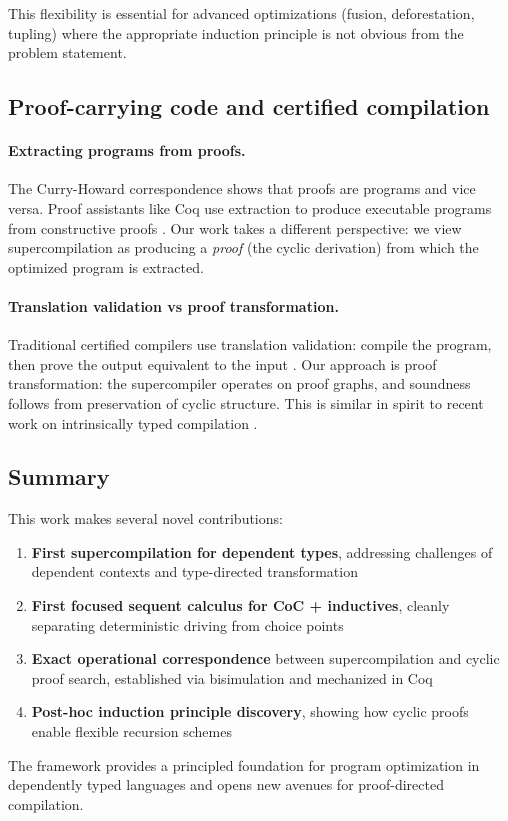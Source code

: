 This flexibility is essential for advanced optimizations (fusion, deforestation, tupling) where the appropriate induction principle is not obvious from the problem statement.

\subsection{Proof-carrying code and certified compilation}

\paragraph{Extracting programs from proofs.}
The Curry-Howard correspondence shows that proofs are programs and vice versa.
Proof assistants like Coq use extraction to produce executable programs from constructive proofs \cite{letouzey-2002-extraction}.
Our work takes a different perspective: we view supercompilation as producing a \emph{proof} (the cyclic derivation) from which the optimized program is extracted.

\paragraph{Translation validation vs proof transformation.}
Traditional certified compilers use translation validation: compile the program, then prove the output equivalent to the input \cite{pnueli-siegel-singerman-1998-translation-validation}.
Our approach is proof transformation: the supercompiler operates on proof graphs, and soundness follows from preservation of cyclic structure.
This is similar in spirit to recent work on intrinsically typed compilation \cite{pickard-hutton-gibbons-2021-calculating-compilers}.

\subsection{Summary}

This work makes several novel contributions:
\begin{enumerate}
\item \textbf{First supercompilation for dependent types}, addressing challenges of dependent contexts and type-directed transformation
\item \textbf{First focused sequent calculus for CoC + inductives}, cleanly separating deterministic driving from choice points
\item \textbf{Exact operational correspondence} between supercompilation and cyclic proof search, established via bisimulation and mechanized in Coq
\item \textbf{Post-hoc induction principle discovery}, showing how cyclic proofs enable flexible recursion schemes
\end{enumerate}

The framework provides a principled foundation for program optimization in dependently typed languages and opens new avenues for proof-directed compilation.
